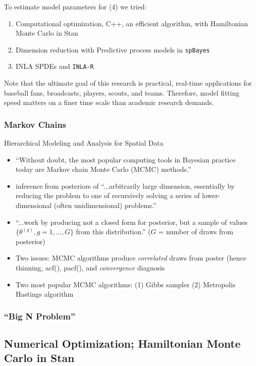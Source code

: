 To estimate model parameters for (4) we tried:
\begin{enumerate}
\item Computational optimization, C++, an efficient algorithm, with Hamiltonian Monte Carlo in Stan
\item Dimension reduction with Predictive process models in \verb|spBayes|
\item INLA SPDEs and \verb|INLA-R|
\end{enumerate}

Note that the ultimate goal of this research is practical, real-time applications for baseball fans, broadcasts, players, scouts, and teams. Therefore, model fitting speed matters on a finer time scale than academic research demands.  

\subsubsection{Markov Chains}

Hierarchical Modeling and Analysis for Spatial Data \citep{Banerjee2014}
        \begin{itemize} %
        \item ``Without doubt, the most popular computing tools in Bayesian practice today are Markov chain Monte Carlo (MCMC) methods.'' 
        \item inference from posteriors of ``...arbitrarily large dimension, essentially by reducing the problem to one of recursively solving a series of lower-dimensional (often unidimensional) problems.'' 
        \item ``...work by producing not a closed form for posterior, but a sample of values $\{\theta^{(g)}, g = 1, \dots, G\}$ from this distribution.'' ($G$ = number of draws from posterior) 
        \item Two issues: MCMC algorithms produce {\it correlated} draws from poster (hence thinning, acf(), pacf(), and {\it convergence} diagnosis 
        \item Two most popular MCMC algorithms: (1) Gibbs sampler (2) Metropolis Hastings algorithm
        \end{itemize} %

\subsubsection{``Big N Problem''}

\subsection{Numerical Optimization; Hamiltonian Monte Carlo in Stan} %


